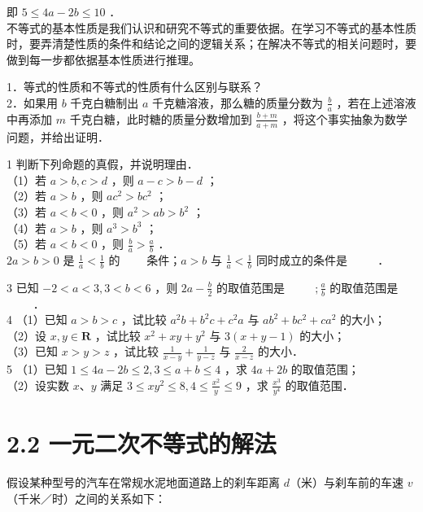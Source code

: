 \documentclass[10pt]{article}
\begin{document}
即 \(5 \leqslant 4 a-2 b \leqslant 10\) ．\\
不等式的基本性质是我们认识和研究不等式的重要依据。在学习不等式的基本性质时，要弄清楚性质的条件和结论之间的逻辑关系；在解决不等式的相关问题时，要做到每一步都依据基本性质进行推理。

1．等式的性质和不等式的性质有什么区别与联系？\\
2．如果用 \(b\) 千克白糖制出 \(a\) 千克糖溶液，那么糖的质量分数为 \(\frac{b}{a}\) ，若在上述溶液中再添加 \(m\) 千克白糖，此时糖的质量分数增加到 \(\frac{b+m}{a+m}\) ，将这个事实抽象为数学问题，并给出证明．

1 判断下列命题的真假，并说明理由．\\
（1）若 \(a>b, c>d\) ，则 \(a-c>b-d\) ；\\
（2）若 \(a>b\) ，则 \(a c^{2}>b c^{2}\) ；\\
（3）若 \(a<b<0\) ，则 \(a^{2}>a b>b^{2}\) ；\\
（4）若 \(a>b\) ，则 \(a^{3}>b^{3}\) ；\\
（5）若 \(a<b<0\) ，则 \(\frac{b}{a}>\frac{a}{b}\) ．\\
\(2 a>b>0\) 是 \(\frac{1}{a}<\frac{1}{b}\) 的 \(\qquad\)条件；\(a>b\) 与 \(\frac{1}{a}<\frac{1}{b}\) 同时成立的条件是 \(\qquad\) ．

3 已知 \(-2<a<3,3<b<6\) ，则 \(2 a-\frac{b}{2}\) 的取值范围是 \(\qquad\) \(; \frac{a}{b}\) 的取值范围是\\
\(\qquad\) ．\\
4 （1）已知 \(a>b>c\) ，试比较 \(a^{2} b+b^{2} c+c^{2} a\) 与 \(a b^{2}+b c^{2}+c a^{2}\) 的大小；\\
（2）设 \(x, y \in \mathbf{R}\) ，试比较 \(x^{2}+x y+y^{2}\) 与 \(3(x+y-1)\) 的大小；\\
（3）已知 \(x>y>z\) ，试比较 \(\frac{1}{x-y}+\frac{1}{y-z}\) 与 \(\frac{2}{x-z}\) 的大小．\\
5 （1）已知 \(1 \leqslant 4 a-2 b \leqslant 2,3 \leqslant a+b \leqslant 4\) ，求 \(4 a+2 b\) 的取值范围；\\
（2）设实数 \(x 、 y\) 满足 \(3 \leqslant x y^{2} \leqslant 8,4 \leqslant \frac{x^{2}}{y} \leqslant 9\) ，求 \(\frac{x^{3}}{y^{4}}\) 的取值范围．

\section*{2.2 一元二次不等式的解法}
假设某种型号的汽车在常规水泥地面道路上的刹车距离 \(d\)（米）与刹车前的车速 \(v\)（千米／时）之间的关系如下：
\end{document}
